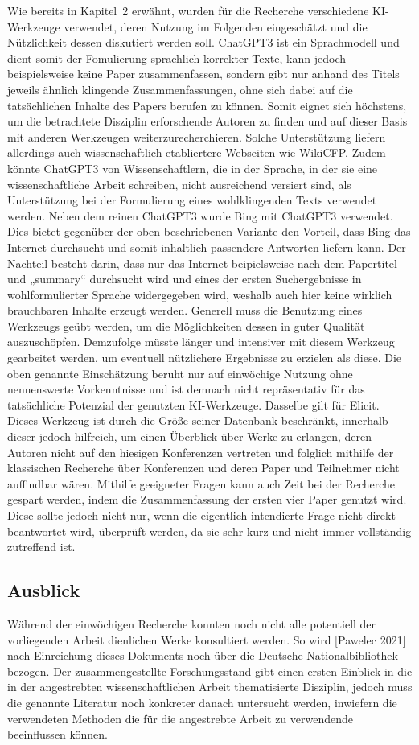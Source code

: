Wie bereits in Kapitel 2 erwähnt, wurden für die Recherche verschiedene KI-Werkzeuge verwendet, deren Nutzung im Folgenden 
eingeschätzt und die Nützlichkeit dessen diskutiert werden soll. 
ChatGPT3 ist ein Sprachmodell und dient somit der Fomulierung sprachlich korrekter Texte, kann jedoch beispielsweise keine Paper 
zusammenfassen, sondern gibt nur anhand des Titels jeweils ähnlich klingende Zusammenfassungen, ohne sich dabei auf die tatsächlichen 
Inhalte des Papers berufen zu können. Somit eignet sich höchstens, um die betrachtete Disziplin erforschende Autoren zu finden 
und auf dieser Basis mit anderen Werkzeugen weiterzurecherchieren. Solche Unterstützung liefern allerdings auch wissenschaftlich
etabliertere Webseiten wie WikiCFP. Zudem könnte ChatGPT3 von Wissenschaftlern, die in der Sprache, in der sie eine wissenschaftliche 
Arbeit schreiben, nicht ausreichend versiert sind, als Unterstützung bei der Formulierung eines wohlklingenden Texts verwendet werden.
Neben dem reinen ChatGPT3 wurde Bing mit ChatGPT3 verwendet. Dies bietet gegenüber der oben beschriebenen Variante den Vorteil, 
dass Bing das Internet durchsucht und somit inhaltlich passendere Antworten liefern kann. Der Nachteil besteht darin, dass nur das 
Internet beipielsweise nach dem Papertitel und „summary“ durchsucht wird und eines der ersten Suchergebnisse in wohlformulierter 
Sprache widergegeben wird, weshalb auch hier keine wirklich brauchbaren Inhalte erzeugt werden.
Generell muss die Benutzung eines Werkzeugs geübt werden, um die Möglichkeiten dessen in guter Qualität auszuschöpfen. Demzufolge 
müsste länger und intensiver mit diesem Werkzeug gearbeitet werden, um eventuell nützlichere Ergebnisse zu erzielen als diese. Die 
oben genannte Einschätzung beruht nur auf einwöchige Nutzung ohne nennenswerte Vorkenntnisse und ist demnach nicht repräsentativ für 
das tatsächliche Potenzial der genutzten KI-Werkzeuge.
Dasselbe gilt für Elicit. Dieses Werkzeug ist durch die Größe seiner Datenbank beschränkt, innerhalb dieser jedoch hilfreich, um 
einen Überblick über Werke zu erlangen, deren Autoren nicht auf den hiesigen Konferenzen vertreten und folglich mithilfe der 
klassischen Recherche über Konferenzen und deren Paper und Teilnehmer nicht auffindbar wären. Mithilfe geeigneter Fragen kann 
auch Zeit bei der Recherche gespart werden, indem die Zusammenfassung der ersten vier Paper genutzt wird. Diese sollte jedoch 
nicht nur, wenn die eigentlich intendierte Frage nicht direkt beantwortet wird, überprüft werden, da sie sehr kurz und nicht 
immer vollständig zutreffend ist.
\subsection{Ausblick}
Während der einwöchigen Recherche konnten noch nicht alle potentiell der vorliegenden Arbeit dienlichen Werke konsultiert werden.
So wird [Pawelec 2021] nach Einreichung dieses Dokuments noch über die Deutsche Nationalbibliothek bezogen.
Der zusammengestellte Forschungsstand gibt einen ersten Einblick in die in der angestrebten wissenschaftlichen Arbeit thematisierte 
Disziplin, jedoch muss die genannte Literatur noch konkreter danach untersucht werden, inwiefern die verwendeten Methoden die für 
die angestrebte Arbeit zu verwendende beeinflussen können.
